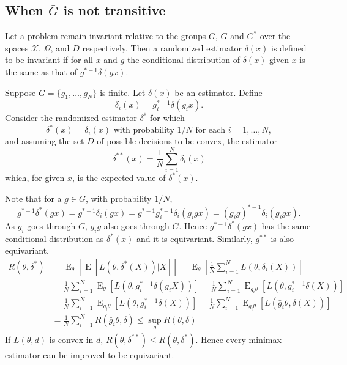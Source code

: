 \documentclass{article}
\DeclareMathOperator{\myE}{E}
\theoremstyle{plain}
\theoremstyle{definition}
\begin{document}
\subsection{When $\bar{G}$ is not transitive}

Let a problem remain invariant relative to the groups $G$, $\bar{G}$ and $G^*$ over the spaces $\mathcal{X}$, $\Omega$, and $D$ respectively.
Then a randomized estimator $\delta(x)$ is defined to be invariant if for all $x$ and $g$ the conditional distribution of $\delta(x)$ given $x$ is the same as that of $g^{*-1}\delta(gx)$.

Suppose $G=\{g_1,\ldots,g_N\}$ is finite.
Let $\delta(x)$ be an estimator. Define
\begin{equation*}
    \delta_i(x)=g_i^{*-1}\delta(g_i x).
\end{equation*}
Consider the randomized estimator $\delta^*$ for which
\begin{equation}\label{randomized1}
    \delta^*(x)=\delta_i (x)\textrm{ with probability $1/N$ for each $i=1,\ldots,N$},
\end{equation}
and assuming the set $D$ of possible decisions to be convex, the estimator
\begin{equation}\label{randomized2}
    \delta^{**} (x)= \frac{1}{N}\sum_{i=1}^N \delta_i(x)
\end{equation}
which, for given $x$, is the expected value of $\delta^*(x)$.

Note that for a $g\in G$, with probability $1/N$, 
\begin{equation*}
    g^{*-1}\delta^*(gx)=g^{*-1}\delta_i(gx)=g^{*-1}g_i^{*-1}\delta_i(g_i g x)=(g_i g)^{*-1}\delta_i(g_i g x). 
\end{equation*}
As $g_i$ goes through $G$, $g_i g$ also goes through $G$.
Hence $g^{*-1}\delta^*(gx)$ has the same conditional distribution as $\delta^*(x)$ and it is equivariant.
Similarly, $g^{**}$ is also equivariant.
\begin{equation*}
    \begin{aligned}
        R(\theta,\delta^{*})&= \myE_\theta[\myE[L(\theta,\delta^{*}(X))|X]]=\myE_\theta[\frac{1}{N}\sum_{i=1}^N L(\theta,\delta_i(X))]\\
        &=
        \frac{1}{N}\sum_{i=1}^N\myE_\theta[ L(\theta,g_i^{*-1}\delta(g_iX))]=
        \frac{1}{N}\sum_{i=1}^N\myE_{g_i\theta}[ L(\theta,g_i^{*-1}\delta(X))]\\
        &=
        \frac{1}{N}\sum_{i=1}^N\myE_{g_i\theta}[ L(\theta,g_i^{*-1}\delta(X))]
        =
        \frac{1}{N}\sum_{i=1}^N\myE_{g_i\theta}[ L(\bar{g}_i\theta,\delta(X))]\\
        &=
        \frac{1}{N}\sum_{i=1}^N R(\bar{g}_i\theta ,\delta)\leq \sup_{\theta}R(\theta,\delta)
    \end{aligned}
\end{equation*}
If $L(\theta,d)$ is convex in $d$, $R(\theta,\delta^{**})\leq R(\theta,\delta^*)$.
Hence every minimax estimator can be improved to be equivariant.
\end{document}
